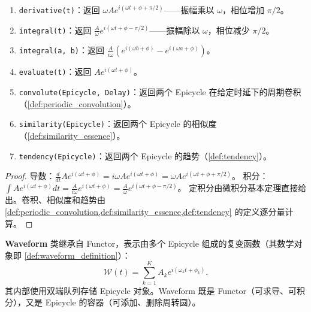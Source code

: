 \begin{property}\label{prop:epicycle_class_methods}
\begin{enumerate}[label=(\roman*)]
    \item \texttt{derivative(t)}：返回 $\omega A e^{i(\omega t + \phi + \pi/2)}$——振幅乘以 $\omega$，相位增加 $\pi/2$。
    \item \texttt{integral(t)}：返回 $\frac{A}{\omega} e^{i(\omega t + \phi - \pi/2)}$——振幅除以 $\omega$，相位减少 $\pi/2$。
    \item \texttt{integral(a, b)}：返回 $\frac{A}{i\omega}(e^{i(\omega b + \phi)} - e^{i(\omega a + \phi)})$。
    \item \texttt{evaluate(t)}：返回 $A e^{i(\omega t + \phi)}$。
    \item \texttt{convolute(Epicycle, Delay)}：返回两个 Epicycle 在给定时延下的周期卷积（\cref{def:periodic_convolution}）。
    \item \texttt{similarity(Epicycle)}：返回两个 Epicycle 的相似度（\cref{def:similarity_essence}）。
    \item \texttt{tendency(Epicycle)}：返回两个 Epicycle 的趋势（\cref{def:tendency}）。
\end{enumerate}
\end{property}

\begin{proof}
导数：$\frac{d}{dt}Ae^{i(\omega t + \phi)} = i\omega A e^{i(\omega t + \phi)} = \omega A e^{i(\omega t + \phi + \pi/2)}$。
积分：$\int Ae^{i(\omega t + \phi)}dt = \frac{A}{i\omega}e^{i(\omega t + \phi)} = \frac{A}{\omega}e^{i(\omega t + \phi - \pi/2)}$。
定积分由微积分基本定理直接给出。卷积、相似度和趋势由 \cref{def:periodic_convolution,def:similarity_essence,def:tendency} 的定义逐分量计算。
\end{proof}

\begin{definition}[Waveform 类]\label{def:waveform_class}
\textbf{Waveform} 类继承自 Functor，表示由多个 Epicycle 组成的复变函数（其数学对象即 \cref{def:waveform_definition}）：
\[
\mathcal{W}(t) = \sum_{k=1}^{K} A_k e^{i(\omega_k t + \phi_k)}.
\]
其内部使用双端队列存储 Epicycle 对象。Waveform 既是 Functor（可求导、可积分），又是 Epicycle 的容器（可添加、删除周转圆）。
\end{definition}

